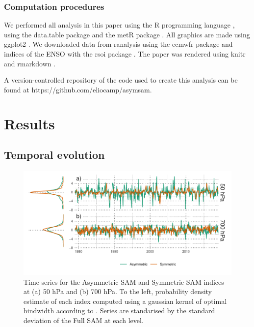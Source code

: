 \documentclass[]{ametsocV5}
\begin{document}
\subsubsection{Computation procedures}

We performed all analysis in this paper using the R programming language
\citep{rcoreteam2020}, using the data.table package \citep{dowle2020}
and the metR package \citep{campitelli2020}. All graphics are made using
ggplot2 \citep{wickham2009}. We downloaded data from ranalysis using the
ecmwfr package \citep{hufkens2020} and indices of the ENSO with the rsoi
package \citep{albers2020}. The paper was rendered using knitr and
rmarkdown \citep{xie2015, allaire2019}.

A version-controlled repository of the code used to create this analysis
can be found at https://github.com/eliocamp/asymsam.

\section{Results}

\label{sec:results}

\subsection{Temporal evolution}

\label{sec:temporal}

\begin{figure}
\includegraphics{asymsam-timeseries-1} \caption[Time series for the Asymmetric SAM and Symmetric SAM indices at (a) 50 hPa and (b) 700 hPa]{Time series for the Asymmetric SAM and Symmetric SAM indices at (a) 50 hPa and (b) 700 hPa. To the left, probability density estimate of each index computed using a gaussian kernel of optimal bindwidth according to \cite{sheather1991}. Series are standarised by the standard deviation of the Full SAM at each level.}\label{fig:asymsam-timeseries}
\end{figure}
\end{document}
